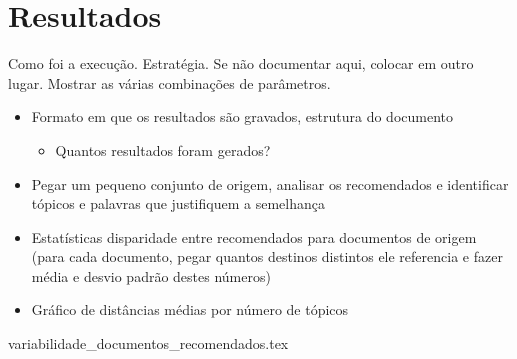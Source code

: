 \section{Resultados}

Como foi a execução. Estratégia. Se não documentar aqui, colocar em outro lugar.
Mostrar as várias combinações de parâmetros.

\begin{itemize}
    \item Formato em que os resultados são gravados, estrutura do documento
    \begin{itemize}
        \item Quantos resultados foram gerados?
    \end{itemize}
    \item Pegar um pequeno conjunto de origem, analisar os recomendados e identificar tópicos e palavras que justifiquem a semelhança
    \item Estatísticas disparidade entre recomendados para documentos de origem (para cada documento, pegar quantos destinos distintos ele 
    referencia e fazer média e desvio padrão destes números)
    \item Gráfico de distâncias médias por número de tópicos
\end{itemize}

{variabilidade_documentos_recomendados.tex}

\begin{comment}
{plano_execucao.tex}
{comportamento_variacao_distancias.tex}
{topico_dominante.tex}    
\end{comment}
